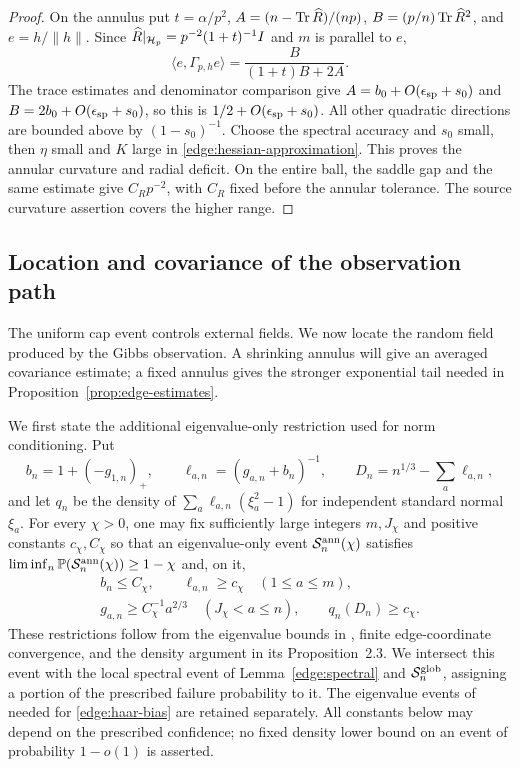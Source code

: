 \begin{proof}
On the annulus put \(t=\alpha/p^2\),
\(A=(n-\operatorname{Tr}\widehat R)/(np)\), \(B=(p/n)\operatorname{Tr}\widehat R^2\), and \(e=h/\|h\|\).
Since \(\widehat R|_{\mathcal H_p}=p^{-2}(1+t)^{-1}I\) and \(m\) is parallel to \(e\),
\[
 \langle e,\Gamma_{p,h}e\rangle=\frac{B}{(1+t)B+2A}.
\]
The trace estimates and denominator comparison give
\(A=b_0+O(\epsilon_{\rm sp}+s_0)\) and
\(B=2b_0+O(\epsilon_{\rm sp}+s_0)\), so this is
\(1/2+O(\epsilon_{\rm sp}+s_0)\).  All other quadratic directions are
bounded above by \((1-s_0)^{-1}\).  Choose the spectral accuracy and
\(s_0\) small, then \(\eta\) small and \(K\) large in
\eqref{edge:hessian-approximation}.  This proves the annular curvature
and radial deficit.  On the entire ball, the saddle gap and the same
estimate give \(C_Rp^{-2}\), with \(C_R\) fixed before the annular
tolerance.  The source curvature assertion covers the higher range.
\end{proof}

\subsection{Location and covariance of the observation path}

The uniform cap event controls external fields.  We now locate the random
field produced by the Gibbs observation.  A shrinking annulus will give
an averaged covariance estimate; a fixed annulus gives the stronger
exponential tail needed in Proposition~\ref{prop:edge-estimates}.

We first state the additional eigenvalue-only restriction used for norm
conditioning.  Put
\[
 b_n=1+(-g_{1,n})_+,\qquad
 \ell_{a,n}=(g_{a,n}+b_n)^{-1},\qquad
 D_n=n^{1/3}-\sum_a\ell_{a,n},
\]
and let \(q_n\) be the density of
\(\sum_a\ell_{a,n}(\xi_a^2-1)\) for independent standard normal
\(\xi_a\).  For every \(\chi>0\), one may fix sufficiently large
integers \(m,J_\chi\) and positive constants \(c_\chi,C_\chi\) so that
an eigenvalue-only event \(\mathcal S_n^{\rm ann}(\chi)\) satisfies
\(\liminf_n\mathbb P(\mathcal S_n^{\rm ann}(\chi))\ge1-\chi\) and, on it,
\begin{equation}\label{edge:conditioned-spectral-event}
 \begin{gathered}
 b_n\le C_\chi,\qquad \ell_{a,n}\ge c_\chi\quad(1\le a\le m),\\
 g_{a,n}\ge C_\chi^{-1}a^{2/3}\quad(J_\chi<a\le n),\qquad
 q_n(D_n)\ge c_\chi.
 \end{gathered}
\end{equation}
These restrictions follow from the eigenvalue bounds in
\cite[Lemma~2.1]{FUA}, finite edge-coordinate convergence, and the
density argument in its Proposition~2.3.  We intersect this event with the local spectral
event of Lemma~\ref{edge:spectral} and \(\mathcal S_n^{\rm glob}\),
assigning a portion of the prescribed failure probability to it.  The
eigenvalue events of \cite[Lemma~2.5]{FUA} needed for
\eqref{edge:haar-bias} are retained separately.  All constants below
may depend on the prescribed confidence; no fixed density lower bound
on an event of probability \(1-o(1)\) is asserted.

